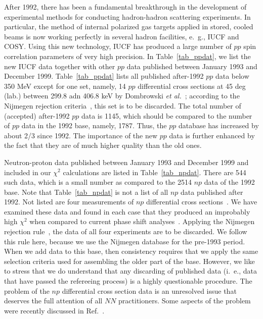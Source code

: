 After 1992, there has been a fundamental breakthrough in 
the development of experimental methods for conducting
hadron-hadron scattering experiments.
In particular, the method of internal polarized gas targets
applied in stored, cooled beams is now working perfectly in several hadron
facilities, e.~g., IUCF and COSY.
Using this new technology, IUCF has produced a large number
of $pp$ spin correlation parameters of very high precision.
In Table~\ref{tab_ppdat}, we list the new IUCF data
together with other $pp$ data published between January 1993 and December
1999. Table~\ref{tab_ppdat} lists all published after-1992
$pp$ data below 350 MeV except for one set, namely, 14  
$pp$ differential cross sections at 45 deg (lab.) between 
299.8 adn 406.8 keV
by Dombrowski {\it et al.}~\cite{Do97}; according to the Nijmegen
rejection criteria~\cite{Ber88}, this set is to be discarded.
The total number of (accepted) after-1992 $pp$ data is 1145, which should be
compared to the number of $pp$ data in the 1992 base, namely, 1787. 
Thus, the $pp$ database has increased by about
2/3 since 1992. The importance of the new $pp$ data is further enhanced 
by the fact that they are of much higher quality than the old ones.

Neutron-proton data published between January 1993 and December 1999
and included in our $\chi^2$ calculations
are listed in Table~\ref{tab_npdat}.  There are 544 such data, which is 
a small number as compared to the 2514 $np$ data of the 1992 base.
Note that Table~\ref{tab_npdat} is not a list of all $np$ data published 
after 1992. Not listed are four measurements
of $np$ differential cross sections~\cite{Go94,Be97,Ra98,Fr99}.
We have examined these data and found
in each case that they produced an improbably high $\chi^2$ when
compared to current phase shift analyses~\cite{Sto93,SM99}.
Applying the Nijmegen rejection rule~\cite{Ber88,Sto93},
the data of all four experiments are to be discarded.
We follow this rule here, because we use the Nijmegen
database for the pre-1993 period. When we add data to this base,
then consistency requires that we apply the same selection criteria
used for assembling the older part of the base.
However, we like to stress that we do understand that any discarding
of published data (i.~e., data that have passed the refereeing process)
is a highly questionable procedure. The problem of the $np$
differential cross section data is an unresolved issue that
deserves the full attention of all $NN$ practitioners.
Some aspects of the problem were recently discussed
in Ref.~\cite{Up99}.

